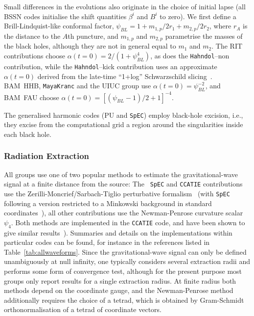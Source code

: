Small differences in the evolutions also originate in the choice of
initial lapse (all BSSN codes initialise the shift 
quantities $\beta^i$ and $B^i$ to zero). We first define a
Brill-Lindquist-like conformal factor, $\psi_{BL} = 1 + m_{1,p}/2 r_1 +
m_{2,p}/2 r_2$, where $r_A$ is the distance to the $A$th
puncture, and $m_{1,p}$ and $m_{2,p}$ parametrise the masses of the black
holes, although they are not in general equal to $m_1$ and $m_2$. 
The RIT contributions choose $\alpha(t=0) = 2/(1+\psi_{BL}^{4})$,
as does the {\tt Hahndol}--non contribution, while the {\tt Hahndol}--kick
contribution uses an approximate $\alpha(t=0)$ derived from the
late-time ``1+log'' Schwarzschild slicing~\cite{Hannam:2006xw}.
BAM~HHB, {\tt MayaKranc} and the UIUC group use $\alpha(t=0) =
\psi_{BL}^{-2}$, and 
BAM~FAU choose $\alpha(t=0) = \left[ (\psi_{BL} - 1)/2 + 1
  \right]^{-4}$. 

The generalised harmonic codes (PU and {\tt SpEC}) employ black-hole
excision, i.e., they excise from the computational grid a region around
the singularities inside each black hole.  

\subsubsection{Radiation Extraction}
\label{ssec:rad}

All groups use one of two popular methods to estimate the
gravitational-wave signal at a finite distance from the source: The {\tt
  SpEC} and {\tt CCATIE} contributions use the Zerilli-Moncrief/Sarbach-Tiglio
perturbative formalism~\cite{Moncrief:1974am,Nagar:2005ea,Sarbach:2001qq} (with
{\tt SpEC} following a version restricted to a Minkowski background in standard coordinates~\cite{Rinne:2008vn}), all other contributions use the
Newman-Penrose curvature scalar $\psi_4$. Both methods are implemented
in the {\tt CCATIE} code, and have been shown to give similar 
results~\cite{Koppitz:2007ev,Pollney:2007ss}). Summaries and details on
the implementations within particular codes can be found, for instance
in the references listed in Table~\ref{tab:allwaveforms}. 
Since the gravitational-wave signal can only be defined
unambiguously at null infinity, one typically considers several
extraction radii and performs some form of convergence test, although for
the present purpose most groups only report results for a single
extraction radius.  At finite radius both methods depend on the
coordinate gauge, and the Newman-Penrose method additionally requires the
choice of a tetrad, which is obtained by Gram-Schmidt orthonormalisation
of a tetrad of coordinate vectors.

